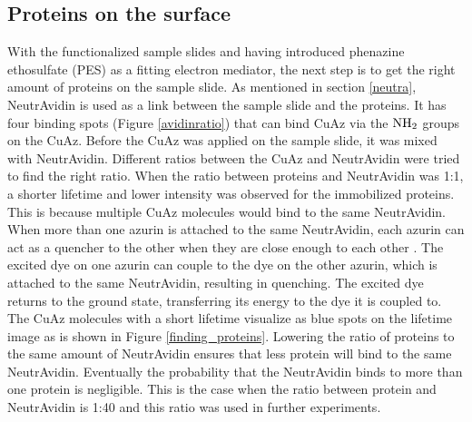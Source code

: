 \documentclass[twoside,single]{lion-msc}
\begin{document}
\subsection{Proteins on the surface}
With the functionalized sample slides and having introduced phenazine ethosulfate (PES) as a fitting electron mediator, the next step is to get the right amount of proteins on the sample slide. As mentioned in section \ref{neutra},  NeutrAvidin is used as a link between the sample slide and the proteins. It has four binding spots  (Figure \ref{avidinratio}) that can bind CuAz via the $\textup{NH}_{2}$ groups on the CuAz.  Before the CuAz was applied on the sample slide, it was mixed with NeutrAvidin. Different ratios between the CuAz and NeutrAvidin were tried to find the right ratio. When the ratio between proteins and NeutrAvidin was 1:1, a shorter lifetime and lower intensity was observed for the immobilized proteins. This is because multiple CuAz molecules would bind to the same NeutrAvidin. When more than one azurin is attached to the same NeutrAvidin, each azurin can act as a quencher to the other when they are close enough to each other \cite{Lakowicz2006}. The excited dye on one azurin can couple to the dye on the other azurin, which is attached to the same NeutrAvidin, resulting in quenching. The excited dye returns to the ground state, transferring its energy to the dye it is coupled to. The CuAz molecules with a short lifetime visualize as blue spots on the lifetime image as is shown in Figure \ref{finding_proteins}. Lowering the ratio of proteins to the same amount of NeutrAvidin ensures that less protein will bind to the same NeutrAvidin. Eventually the probability that the NeutrAvidin binds to more than one protein is negligible. This is the case when the ratio between protein and NeutrAvidin is 1:40 and this ratio was used in further experiments.
\end{document}
